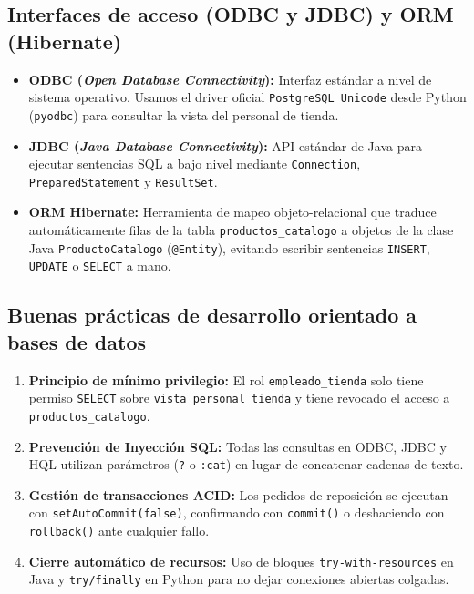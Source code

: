 \documentclass[a4paper,12pt]{article}
\begin{document}
\subsection{Interfaces de acceso (ODBC y JDBC) y ORM (Hibernate)}
\begin{itemize}[leftmargin=1.0cm]
    \item \textbf{ODBC (\textit{Open Database Connectivity}):} Interfaz estándar a nivel de sistema operativo. Usamos el driver oficial \texttt{PostgreSQL Unicode} desde Python (\texttt{pyodbc}) para consultar la vista del personal de tienda.
    \item \textbf{JDBC (\textit{Java Database Connectivity}):} API estándar de Java para ejecutar sentencias SQL a bajo nivel mediante \texttt{Connection}, \texttt{PreparedStatement} y \texttt{ResultSet}.
    \item \textbf{ORM Hibernate:} Herramienta de mapeo objeto-relacional que traduce automáticamente filas de la tabla \texttt{productos\_catalogo} a objetos de la clase Java \texttt{ProductoCatalogo} (\texttt{@Entity}), evitando escribir sentencias \texttt{INSERT}, \texttt{UPDATE} o \texttt{SELECT} a mano.
\end{itemize}

\subsection{Buenas prácticas de desarrollo orientado a bases de datos}
\begin{enumerate}[leftmargin=1.0cm]
    \item \textbf{Principio de mínimo privilegio:} El rol \texttt{empleado\_tienda} solo tiene permiso \texttt{SELECT} sobre \texttt{vista\_personal\_tienda} y tiene revocado el acceso a \texttt{productos\_catalogo}.
    \item \textbf{Prevención de Inyección SQL:} Todas las consultas en ODBC, JDBC y HQL utilizan parámetros (\texttt{?} o \texttt{:cat}) en lugar de concatenar cadenas de texto.
    \item \textbf{Gestión de transacciones ACID:} Los pedidos de reposición se ejecutan con \texttt{setAutoCommit(false)}, confirmando con \texttt{commit()} o deshaciendo con \texttt{rollback()} ante cualquier fallo.
    \item \textbf{Cierre automático de recursos:} Uso de bloques \texttt{try-with-resources} en Java y \texttt{try/finally} en Python para no dejar conexiones abiertas colgadas.
\end{enumerate}
\end{document}

